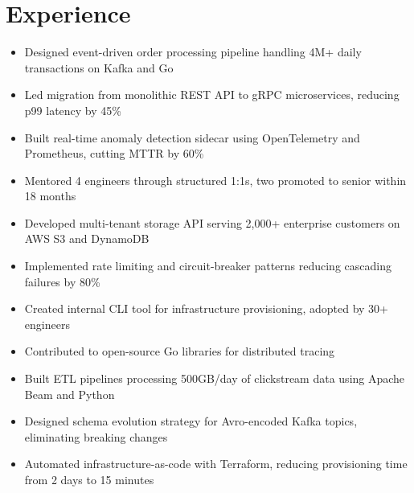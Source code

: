 
\section{Experience}




\begin{itemize}

  \item Designed event-driven order processing pipeline handling 4M+ daily transactions on Kafka and Go

  \item Led migration from monolithic REST API to gRPC microservices, reducing p99 latency by 45\%

  \item Built real-time anomaly detection sidecar using OpenTelemetry and Prometheus, cutting MTTR by 60\%

  \item Mentored 4 engineers through structured 1:1s, two promoted to senior within 18 months

\end{itemize}





\begin{itemize}

  \item Developed multi-tenant storage API serving 2,000+ enterprise customers on AWS S3 and DynamoDB

  \item Implemented rate limiting and circuit-breaker patterns reducing cascading failures by 80\%

  \item Created internal CLI tool for infrastructure provisioning, adopted by 30+ engineers

  \item Contributed to open-source Go libraries for distributed tracing

\end{itemize}





\begin{itemize}

  \item Built ETL pipelines processing 500GB/day of clickstream data using Apache Beam and Python

  \item Designed schema evolution strategy for Avro-encoded Kafka topics, eliminating breaking changes

  \item Automated infrastructure-as-code with Terraform, reducing provisioning time from 2 days to 15 minutes

\end{itemize}



